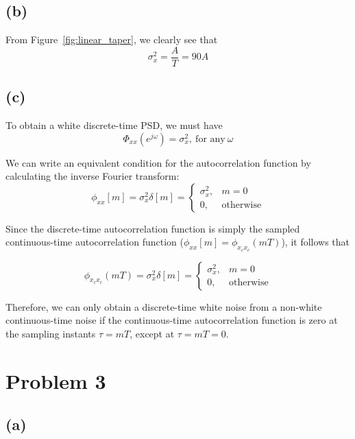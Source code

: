\documentclass{article}
\begin{document}
\subsection{(b)}

From Figure~\ref{fig:linear_taper}, we clearly see that
\begin{equation}
\sigma_x^2 = \frac{A}{T} = 90A
\end{equation}

\subsection{(c)}

To obtain a white discrete-time PSD, we must have
\begin{equation}
\Phi_{xx}(e^{j\omega}) =\sigma_x^2, ~\text{for any}~\omega
\end{equation}

We can write an equivalent condition for the autocorrelation function by calculating the inverse Fourier transform:
\begin{equation}
\phi_{xx}[m] = \sigma_x^2\delta[m] = \begin{cases}
\sigma_x^2, & m = 0 \\
0, & \text{otherwise}
\end{cases}
\end{equation}

Since the discrete-time autocorrelation function is simply the sampled continuous-time autocorrelation function ($\phi_{xx}[m] = \phi_{x_cx_c}(mT)$), it follows that

\begin{equation}
\phi_{x_cx_c}(mT) = \sigma_x^2\delta[m] = \begin{cases}
\sigma_x^2, & m = 0 \\
0, & \text{otherwise}
\end{cases}
\end{equation}

Therefore, we can only obtain a discrete-time white noise from a non-white continuous-time noise if the continuous-time autocorrelation function is zero at the sampling instants $\tau = mT$, except at $\tau = mT = 0$.

\section{Problem 3}	
\subsection{(a)}
\end{document}
